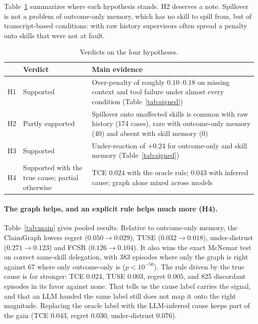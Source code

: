 \documentclass[letterpaper]{article}
\begin{document}
Table~\ref{tab:hyp} summarizes where each hypothesis stands. H2 deserves a note. Spillover is not a problem of outcome-only memory, which has no skill to spill from, but of transcript-based conditions: with raw history supervisors often spread a penalty onto skills that were not at fault.

\begin{table}[t]
\centering\scriptsize
\setlength{\tabcolsep}{3pt}
\begin{tabular}{p{0.9cm}p{2.1cm}p{4.2cm}}
\toprule
 & Verdict & Main evidence\\
\midrule
H1 & Supported & Over-penalty of roughly $0.10$--$0.18$ on missing context and tool failure under almost every condition (Table~\ref{tab:signed})\\
H2 & Partly supported & Spillover onto unaffected skills is common with raw history (174 cases), rare with outcome-only memory (40) and absent with skill memory (0)\\
H3 & Supported & Under-reaction of $+0.24$ for outcome-only and skill memory (Table~\ref{tab:signed})\\
H4 & Supported with the true cause; partial otherwise & TCE $0.024$ with the oracle rule; $0.043$ with inferred cause; graph alone mixed across models\\
\bottomrule
\end{tabular}
\caption{Verdicts on the four hypotheses.}
\label{tab:hyp}
\end{table}

\paragraph{The graph helps, and an explicit rule helps much more (H4).}
Table~\ref{tab:main} gives pooled results. Relative to outcome-only memory, the ClaimGraph lowers regret ($0.050\to0.029$), TUSE ($0.032\to0.018$), under-distrust ($0.271\to0.123$) and FCSR ($0.126\to0.104$). It also wins the exact McNemar test on correct same-skill delegation, with 383 episodes where only the graph is right against 67 where only outcome-only is ($p<10^{-50}$). The rule driven by the true cause is far stronger: TCE $0.024$, TUSE $0.003$, regret $0.005$, and 825 discordant episodes in its favor against none. That tells us the cause label carries the signal, and that an LLM handed the same label still does not map it onto the right magnitude. Replacing the oracle label with the LLM-inferred cause keeps part of the gain (TCE $0.043$, regret $0.030$, under-distrust $0.076$).
\end{document}
